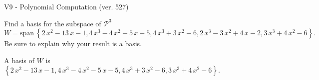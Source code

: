 \begin{exercise}
  \begin{exerciseTitle}V9 - Polynomial Computation (ver. 527)\end{exerciseTitle}
  \begin{exerciseStatement}
    Find a basis for the subspace of \(\mathcal{P}^3\) 
\[W=\mathrm{span}\ \left\{2 \, x^{2} - 13 \, x - 1 , 4 \, x^{3} - 4 \, x^{2} - 5 \, x - 5 , 4 \, x^{3} + 3 \, x^{2} - 6 , 2 \, x^{3} - 3 \, x^{2} + 4 \, x - 2 , 3 \, x^{3} + 4 \, x^{2} - 6\right\}.\]
 Be sure to explain why your result is a basis.


  \end{exerciseStatement}
  \begin{exerciseAnswer}
   A basis of \(W\) is  \(\left\{2 \, x^{2} - 13 \, x - 1 , 4 \, x^{3} - 4 \, x^{2} - 5 \, x - 5 , 4 \, x^{3} + 3 \, x^{2} - 6 , 3 \, x^{3} + 4 \, x^{2} - 6\right\}\).
  


  \end{exerciseAnswer}
\end{exercise}